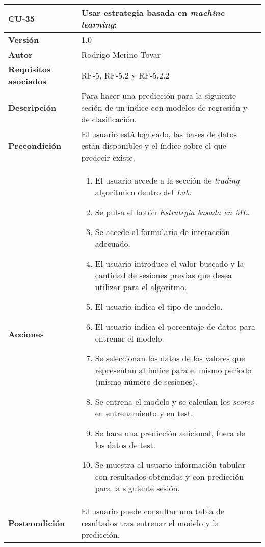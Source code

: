 \begin{table}[p]
	\centering
	\begin{tabularx}{\linewidth}{ p{} p{} }
		\toprule
		\textbf{CU-35}    & \textbf{Usar estrategia basada en \emph{machine learning}:}\\
		\toprule
		\textbf{Versión}              & 1.0    \\
		\textbf{Autor}                & Rodrigo Merino Tovar \\
		\textbf{Requisitos asociados} & RF-5, RF-5.2 y RF-5.2.2   \\
		\textbf{Descripción}          & Para hacer una predicción para la siguiente sesión de un índice con modelos de regresión y de clasificación.\\
		\textbf{Precondición}         & El usuario está logueado, las bases de datos están disponibles y el índice sobre el que predecir existe.  \\
		\textbf{Acciones}             &
		\begin{enumerate}
			\def\labelenumi{\arabic{enumi}.}
			\tightlist 
			\item El usuario accede a la sección de \emph{trading} algorítmico dentro del \emph{Lab}.
			\item Se pulsa el botón \emph{Estrategia basada en ML}. 
			\item Se accede al formulario de interacción adecuado. 
			\item El usuario introduce el valor buscado y la cantidad de sesiones previas que desea utilizar para el algoritmo.
			\item El usuario indica el tipo de modelo. 
			\item El usuario indica el porcentaje de datos para entrenar el modelo.
			\item Se seleccionan los datos de los valores que representan al índice para el mismo período (mismo número de sesiones).
			\item Se entrena el modelo y se calculan los \emph{scores} en entrenamiento y en test. 
			\item Se hace una predicción adicional, fuera de los datos de test. 
			\item Se muestra al usuario información tabular con resultados obtenidos y con predicción para la siguiente sesión. 
		\end{enumerate}\\
		\textbf{Postcondición}        & El usuario puede consultar una tabla de resultados tras entrenar el modelo y la predicción. \\

\end{tabularx}
\end{table}
